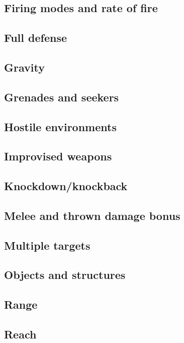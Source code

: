 \subsection{Firing modes and rate of fire}

\subsection{Full defense}

\subsection{Gravity}

\subsection{Grenades and seekers}

\subsection{Hostile environments}

\subsection{Improvised weapons}

\subsection{Knockdown/knockback}

\subsection{Melee and thrown damage bonus}

\subsection{Multiple targets}

\subsection{Objects and structures}

\subsection{Range}

\subsection{Reach}

